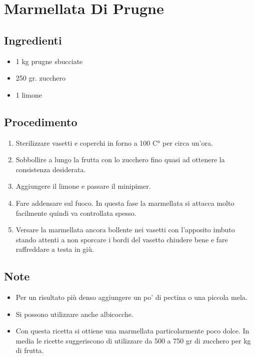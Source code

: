 \section{Marmellata Di Prugne}
\subsection{Ingredienti}
\begin{itemize}
\item 1 kg prugne sbucciate  
\item 250 gr. zucchero  
\item 1 limone
\end{itemize}
\subsection{Procedimento}
\begin{enumerate}
\item  Sterilizzare vasetti e coperchi in forno a 100 C° per circa un'ora.  
\item  Sobbollire a lungo la frutta con lo zucchero fino quasi ad ottenere la consistenza desiderata.  
\item  Aggiungere il limone e passare il minipimer.  
\item  Fare addensare sul fuoco. In questa fase la marmellata si attacca molto facilmente quindi va controllata spesso.  
\item  Versare la marmellata ancora bollente nei vasetti con l'apposito imbuto stando attenti a non sporcare i bordi del vasetto chiudere bene e fare raffreddare a testa in giù.
\end{enumerate}
\subsection{Note}
\begin{itemize}
\item Per un risultato più denso aggiungere un po' di pectina o una piccola mela.   
\item Si possono utilizzare anche albicocche.  
\item Con questa ricetta si ottiene una marmellata particolarmente poco dolce. In media le ricette suggeriscono di utilizzare da 500 a 750 gr di zucchero per kg di frutta.
\end{itemize}
